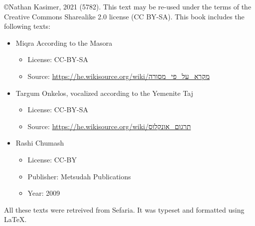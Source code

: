 \frontmatter
{}

\title{\texttitle}

\author{}

\date{}

\maketitle

\begin{minipage}[b][\textheight][b]{\textwidth}\englishfont	
	\begin{english}
		\vfill
		©Nathan Kasimer, 2021 (5782). This text may be re-used under the terms of the Creative Commons Sharealike 2.0 license (CC BY-SA). This book includes the following texts:
		\begin{itemize}
			\item Miqra According to the Masora
			\begin{itemize}
				\item License: CC-BY-SA
				\item Source: \url{https://he.wikisource.org/wiki/מקרא_על_פי_מסורה}
			\end{itemize}
			\item Targum Onkelos, vocalized according to the Yemenite Taj
			\begin{itemize}
				\item License: CC-BY-SA
				\item Source: \url{https://he.wikisource.org/wiki/תרגום_אונקלוס}
			\end{itemize}
			\item Rashi Chumash
			\begin{itemize}
				\item License: CC-BY
				\item Publisher: Metsudah Publications
				\item Year: 2009
			\end{itemize}
		\end{itemize}
		All these texts were retreived from Sefaria.  It was typeset and formatted using \LaTeX .
		\clearpage
		
	\end{english}
\end{minipage}

